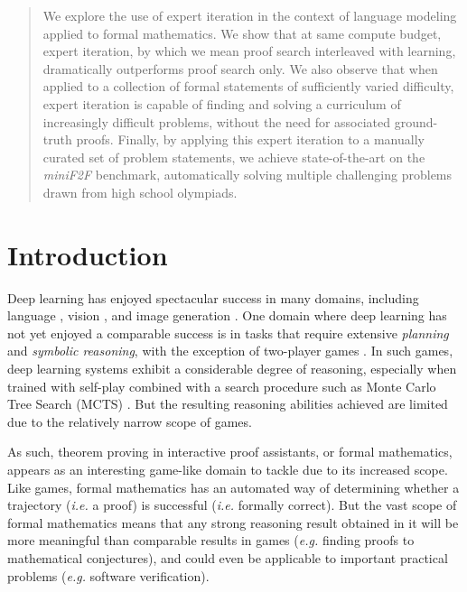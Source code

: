 \documentclass[nohyperref]{article}
\theoremstyle{plain}
\theoremstyle{definition}
\theoremstyle{remark}
\begin{document}
\begin{abstract}
We explore the use of expert iteration in the context of language modeling applied to formal mathematics. We show that at same compute budget, expert iteration, by which we mean proof search interleaved with learning, dramatically outperforms proof search only. We also observe that when applied to a collection of formal statements of sufficiently varied difficulty, expert iteration is capable of finding and solving a curriculum of increasingly difficult problems, without the need for associated ground-truth proofs. Finally, by applying this expert iteration to a manually curated set of problem statements, we achieve state-of-the-art on the \textit{miniF2F} benchmark, automatically solving multiple challenging problems drawn from high school olympiads.
\end{abstract}

\section{Introduction}

Deep learning has enjoyed spectacular success in many domains, including language \cite{brown2020language,devlin2018bert,wu2016google}, vision \cite{radford2021learning,tan2019efficientnet}, and image generation \cite{ramesh2021zero,karras2019style}. One domain where deep learning has not yet enjoyed a comparable success is in tasks that require extensive \emph{planning} and \emph{symbolic reasoning}, with the exception of two-player games \cite{silver2016mastering,silver2017mastering,berner2019dota,vinyals2019grandmaster}. In such games, deep learning systems exhibit a considerable degree of reasoning, especially when trained with self-play combined with a search procedure such as Monte Carlo Tree Search (MCTS) \cite{browne2012survey}. But the resulting reasoning abilities achieved are limited due to the relatively narrow scope of games.

As such, theorem proving in interactive proof assistants, or formal mathematics, appears as an interesting game-like domain to tackle due to its increased scope. Like games, formal mathematics has an automated way of determining whether a trajectory (\emph{i.e.} a proof) is successful (\emph{i.e.} formally correct). But the vast scope of formal mathematics means that any strong reasoning result obtained in it will be more meaningful than comparable results in games (\emph{e.g.} finding proofs to mathematical conjectures), and could even be applicable to important practical problems (\emph{e.g.} software verification).
\end{document}
